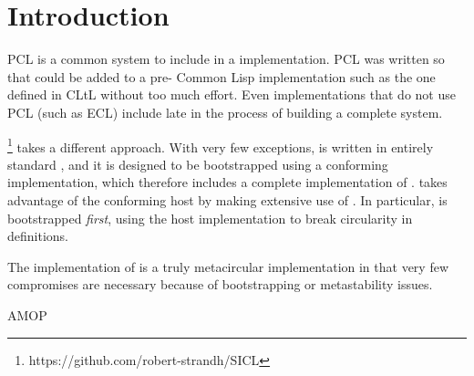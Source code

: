 \section{Introduction}

PCL \cite{Bobrow:1986:CML:28697.28700} is a common system to include
in a \cl{} implementation.  PCL was written so that \clos{} could be
added to a pre-\clos{} Common Lisp implementation such as the one
defined in CLtL \cite{Steele:1984:CLL} without too much effort.  Even
\cl{} implementations that do not use PCL (such as ECL) include
\clos{} late in the process of building a complete system.

\sicl{}\footnote{https://github.com/robert-strandh/SICL} takes a
different approach.  With very few exceptions, \sicl{} is written in
entirely standard \cl{}, and it is designed to be bootstrapped using a
conforming \cl{} implementation, which therefore includes a complete
implementation of \clos{}.  \sicl{} takes advantage of the conforming
host by making extensive use of \clos{}.  In particular, \clos{} is
bootstrapped \emph{first}, using the host \clos{} implementation to
break circularity in definitions. 

The \sicl{} implementation of \clos{} is a truly metacircular
implementation in that very few compromises are necessary because of
bootstrapping or metastability issues.

AMOP \cite{Kiczales:1991:AMP:574212}

